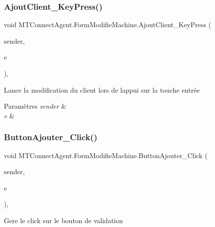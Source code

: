 \subsubsection{\texorpdfstring{Ajout\+Client\+\_\+\+Key\+Press()}{AjoutClient\_KeyPress()}}
{\footnotesize\ttfamily void M\+T\+Connect\+Agent.\+Form\+Modifie\+Machine.\+Ajout\+Client\+\_\+\+Key\+Press (\begin{DoxyParamCaption}\item[{object}]{sender,  }\item[{Key\+Press\+Event\+Args}]{e }\end{DoxyParamCaption})\hspace{0.3cm}{\ttfamily [inline]}, {\ttfamily [private]}}



Lance la modification du client lors de l\textquotesingle{}appui sur la touche entrée 


\begin{DoxyParams}{Paramètres}
{\em sender} & \\
\hline
{\em e} & \\
\hline
\end{DoxyParams}
\mbox{\label{class_m_t_connect_agent_1_1_form_modifie_machine_a6e51e76ab8b6b3011df81c75aef5db2c}} 
\subsubsection{\texorpdfstring{Button\+Ajouter\+\_\+\+Click()}{ButtonAjouter\_Click()}}
{\footnotesize\ttfamily void M\+T\+Connect\+Agent.\+Form\+Modifie\+Machine.\+Button\+Ajouter\+\_\+\+Click (\begin{DoxyParamCaption}\item[{object}]{sender,  }\item[{Event\+Args}]{e }\end{DoxyParamCaption})\hspace{0.3cm}{\ttfamily [inline]}, {\ttfamily [private]}}



Gere le click sur le bouton de validation 


